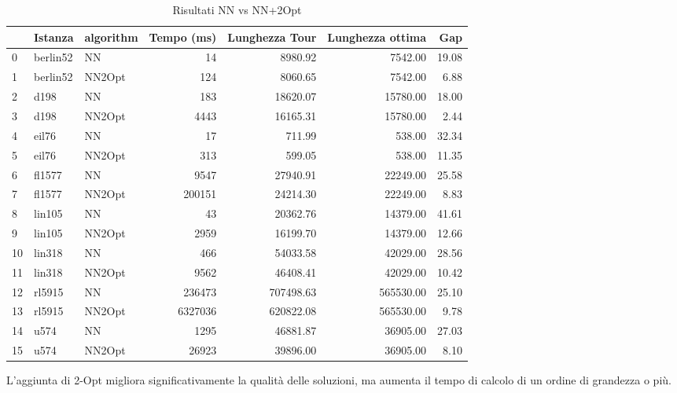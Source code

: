 \begin{table}
	\centering
	\caption{Risultati NN vs NN+2Opt}
	\begin{tabular}{lllrrrr}
		\toprule
		   & Istanza  & algorithm & Tempo (ms) & Lunghezza Tour & Lunghezza ottima & Gap   \\
		\midrule
		0  & berlin52 & NN        & 14         & 8980.92        & 7542.00          & 19.08 \\
		1  & berlin52 & NN2Opt    & 124        & 8060.65        & 7542.00          & 6.88  \\
		2  & d198     & NN        & 183        & 18620.07       & 15780.00         & 18.00 \\
		3  & d198     & NN2Opt    & 4443       & 16165.31       & 15780.00         & 2.44  \\
		4  & eil76    & NN        & 17         & 711.99         & 538.00           & 32.34 \\
		5  & eil76    & NN2Opt    & 313        & 599.05         & 538.00           & 11.35 \\
		6  & fl1577   & NN        & 9547       & 27940.91       & 22249.00         & 25.58 \\
		7  & fl1577   & NN2Opt    & 200151     & 24214.30       & 22249.00         & 8.83  \\
		8  & lin105   & NN        & 43         & 20362.76       & 14379.00         & 41.61 \\
		9  & lin105   & NN2Opt    & 2959       & 16199.70       & 14379.00         & 12.66 \\
		10 & lin318   & NN        & 466        & 54033.58       & 42029.00         & 28.56 \\
		11 & lin318   & NN2Opt    & 9562       & 46408.41       & 42029.00         & 10.42 \\
		12 & rl5915   & NN        & 236473     & 707498.63      & 565530.00        & 25.10 \\
		13 & rl5915   & NN2Opt    & 6327036    & 620822.08      & 565530.00        & 9.78  \\
		14 & u574     & NN        & 1295       & 46881.87       & 36905.00         & 27.03 \\
		15 & u574     & NN2Opt    & 26923      & 39896.00       & 36905.00         & 8.10  \\
		\bottomrule
	\end{tabular}
\end{table}

L'aggiunta di 2-Opt migliora significativamente la qualità delle soluzioni, ma aumenta il tempo di calcolo di un ordine di grandezza o più.

